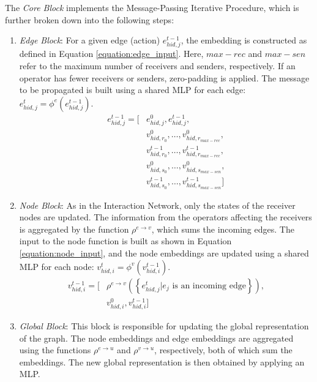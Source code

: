The \textit{Core Block} implements the Message-Passing Iterative Procedure, which is further broken down into the following steps:

\begin{enumerate}
    \item \textit{Edge Block}: For a given edge (action) $e_{hid,j}^{t-1}$, the embedding is constructed as defined in Equation \ref{equation:edge_input}. Here, $max-rec$ and $max-sen$ refer to the maximum number of receivers and senders, respectively. If an operator has fewer receivers or senders, zero-padding is applied. The message to be propagated is built using a shared MLP for each edge: $e_{hid,j}^{t} = \phi^{e}(e_{hid,j}^{t-1})$.
    \begin{equation}
        \begin{aligned}
            e_{hid, j}^{t-1} = \Big[ & e_{hid,j}^{0}, e_{hid,j}^{t-1}, \\
            & v_{hid,r_0}^{0}, \dots, v_{hid,r_{max-rec}}^{0}, \\
            & v_{hid,r_0}^{t-1}, \dots, v_{hid,r_{max-rec}}^{t-1}, \\
            & v_{hid,s_0}^{0}, \dots, v_{hid,s_{max-sen}}^{0}, \\
            & v_{hid,s_0}^{t-1}, \dots, v_{hid,s_{max-sen}}^{t-1} \Big]
        \end{aligned}
        \label{equation:edge_input}
    \end{equation}
    
    \item \textit{Node Block}: As in the Interaction Network, only the states of the receiver nodes are updated. The information from the operators affecting the receivers is aggregated by the function $\rho^{e \rightarrow v}$, which sums the incoming edges. The input to the node function is built as shown in Equation \ref{equation:node_input}, and the node embeddings are updated using a shared MLP for each node: $v_{hid,i}^{t} = \phi^{v}(v_{hid,i}^{t-1})$.
    \begin{equation}
        \begin{aligned}
            v_{hid, i}^{t-1} = \Big[ & \rho^{e \rightarrow v}(\left\{e_{hid,j}^{t} | e_j \text{ is an incoming edge} \right\}), \\
            & v_{hid,i}^{0}, v_{hid,i}^{t-1} \Big]
        \end{aligned}
        \label{equation:node_input}
    \end{equation}
    
    \item \textit{Global Block}: This block is responsible for updating the global representation of the graph. The node embeddings and edge embeddings are aggregated using the functions $\rho^{e \rightarrow u}$ and $\rho^{v \rightarrow u}$, respectively, both of which sum the embeddings. The new global representation is then obtained by applying an MLP.
\end{enumerate}

